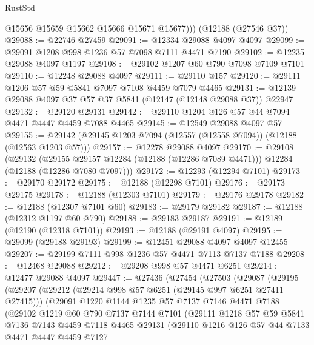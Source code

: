 \begin{lexlean}{RustStd}
\begin{coremodule}
          @15656
          @15659
          @15662
          @15666
          @15671
          @15677)))
    (@12188 (@27546 @37))
@29088 := @22746 @27459
@29091 := @12334 @29088 @4097 @4097
@29099 := @29091 @1208 @998 @1236 @57 @7098 @7111 @4471 @7190
@29102 := @12235 @29088 @4097 @1197
@29108 := @29102 @1207 @60 @790 @7098 @7109 @7101
@29110 := @12248 @29088 @4097
@29111 := @29110 @157
@29120 := @29111 @1206 @57 @59 @5841 @7097 @7108 @4459 @7079 @4465
@29131 := @12139 @29088 @4097 @37 @57 @37 @5841 (@12147 (@12148 @29088 @37)) @22947
@29132 := @29120 @29131
@29142 := @29110 @1204 @126 @57 @44 @7094 @4471 @4447 @4459 @7088 @4465
@29145 := @12549 @29088 @4097 @57
@29155 := @29142 (@29145 @1203 @7094 (@12557 (@12558 @7094)) (@12188 (@12563 @1203 @57)))
@29157 := @12278 @29088 @4097
@29170 := @29108
    (@29132
      (@29155 @29157 @12284 (@12188 (@12286 @7089 @4471)))
      @12284
      (@12188 (@12286 @7080 @7097)))
@29172 := @12293 (@12294 @7101)
@29173 := @29170 @29172
@29175 := @12188 (@12298 @7101)
@29176 := @29173 @29175
@29178 := @12188 (@12303 @7101)
@29179 := @29176 @29178
@29182 := @12188 (@12307 @7101 @60)
@29183 := @29179 @29182
@29187 := @12188 (@12312 @1197 @60 @790)
@29188 := @29183 @29187
@29191 := @12189 (@12190 (@12318 @7101))
@29193 := @12188 (@29191 @4097)
@29195 := @29099 (@29188 @29193)
@29199 := @12451 @29088 @4097 @4097 @12455
@29207 := @29199 @7111 @998 @1236 @57 @4471 @7113 @7137 @7188
@29208 := @12468 @29088
@29212 := @29208 @998 @57 @4471 @6251
@29214 := @12477 @29088 @4097
@29447 := @27436
    (@27454
      (@27503
        (@29087
          (@29195
            (@29207
              (@29212 (@29214 @998 @57 @6251 (@29145 @997 @6251 @27411 @27415)))
              (@29091
                @1220
                @1144
                @1235
                @57
                @7137
                @7146
                @4471
                @7188
                (@29102
                  @1219
                  @60
                  @790
                  @7137
                  @7144
                  @7101
                  (@29111
                    @1218
                    @57
                    @59
                    @5841
                    @7136
                    @7143
                    @4459
                    @7118
                    @4465
                    @29131
                    (@29110
                      @1216
                      @126
                      @57
                      @44
                      @7133
                      @4471
                      @4447
                      @4459
                      @7127

\end{coremodule}
\end{lexlean}
